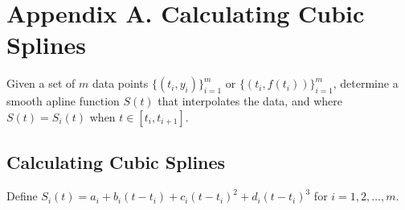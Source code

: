 \chapter*{Appendix A. Calculating Cubic Splines}

\begin{remark}[Problem]
    Given a set of \( m \) data points \( \{ (t_i, y_i) \}_{i=1}^{m} \) or \( \{ (t_i, f(t_i)) \}_{i=1}^{m} \), determine a smooth apline function \( S(t) \) that interpolates the data, and where \( S(t) = S_i(t) \) when \( t \in [t_i, t_{i+1}] \).
\end{remark}

\section*{Calculating Cubic Splines}

Define \( S_i(t) = a_i + b_i(t - t_i) + c_i(t - t_i)^2 + d_i(t - t_i)^3 \) for \( i = 1, 2, \dots, m \).